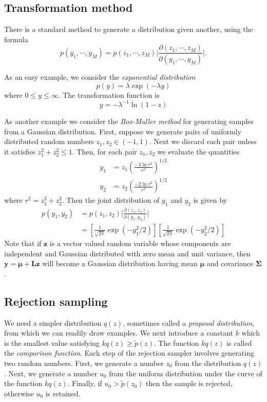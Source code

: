 \documentclass[a4paper]{book}
\renewcommand{\bf}{\mathbf}
\newcommand{\imp}[1]{\textit{#1}}
\newcommand{\bs}{\boldsymbol}
\begin{document}
\subsection{Transformation method}
There is a standard method to generate a distribution given another, using the formula
\begin{equation}
	p(y_1,\cdots,y_M) = p(z_1,\cdots,z_M) \bigg| \frac{\partial(z_1,\cdots,z_M)}{\partial (y_1,\cdots,y_M)}  \bigg|.
\end{equation}

As an easy example, we consider the \imp{exponential distribution}
\begin{equation}
	p(y) = \lambda \exp(-\lambda y)
\end{equation}
where $0 \leq y \leq \infty$. The transformation function is
\begin{equation}
	y = -\lambda ^{-1} \ln(1-z)
\end{equation}

As another example we consider the \imp{Box-Muller method} for generating samples from a Gaussian distribution. First, suppose we generate pairs of uniformly distributed random numbers $z_1,z_2 \in (-1,1)$. Next we discard each pair unless it satisfies $z_1^2 +z_2^2 \leq 1$. Then, for each pair $z_1,z_2$ we evaluate the quantities
\begin{align}
	y_1 &= z_1 \left( \frac{-2 \ln r^2}{r^2} \right)^{1/2} \\
	y_2 &= z_2 \left( \frac{-2 \ln r^2}{r^2} \right)^{1/2}
\end{align}
where $r^2 = z_1^2 + z_2^2$. Then the joint distribution of $y_1$ and $y_2$ is given by
\begin{align}
	p(y_1,y_2) &= p(z_1,z_2)\bigg| \frac{\partial(z_1,z_2)}{\partial(y_1,y_2)} \bigg| \\
	&= \left[ \frac{1}{\sqrt{2\pi}} \exp(-y_1^2/2) \right] \left[ \frac{1}{\sqrt{2\pi}} \exp(-y_2^2 /2)\right]
\end{align}
Note that if $\bf{z}$ is a vector valued random variable whose components are independent and Gaussian distributed with zero mean and unit variance, then $\bf{y} = \bs{\mu} + \bf{Lz}$ will become a Gaussian distribution having mean $\bs{\mu}$ and covariance $\bs{\Sigma}$.
\subsection{Rejection sampling}
We need a simpler distribution $q(z)$, sometimes called a \imp{proposal distribution}, from which we can readily draw examples. We next introduce a constant $k$ which is the smallest value satisfying $kq(z) \geq \tilde{p}(z)$. The function $kq(z)$ is called the \imp{comparison function}. Each step of the rejection sampler involves generating two random numbers. First, we generate a number $z_0$ from the distribution $q(z)$. Next, we generate a number $u_0$ from the uniform distribution under the curve of the function $kq(z)$. Finally, if $u_0 > \tilde{p}(z_0)$ then the sample is rejected, otherwise $u_0$ is retained.
\end{document}
